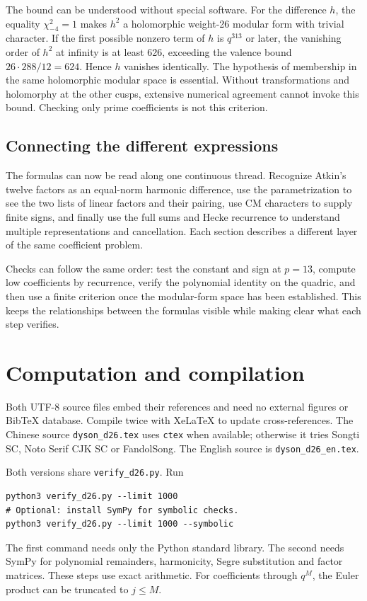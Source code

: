 \documentclass[a4paper,11pt]{article}
\theoremstyle{definition}
\begin{document}
The bound can be understood without special software.
For the difference \(h\), the equality \(\chi_{-4}^2=1\) makes
\(h^2\) a holomorphic weight-26 modular form with trivial character.
If the first possible nonzero term of \(h\) is \(q^{313}\) or later,
the vanishing order of \(h^2\) at infinity is at least 626, exceeding
the valence bound \(26\cdot288/12=624\). Hence \(h\) vanishes identically.
The hypothesis of membership in the same holomorphic modular space
is essential. Without transformations and holomorphy at the other
cusps, extensive numerical agreement cannot invoke this bound.
Checking only prime coefficients is not this criterion.


\subsection{Connecting the different expressions}
The formulas can now be read along one continuous thread.
Recognize Atkin's twelve factors as an equal-norm harmonic difference,
use the parametrization to see the two lists of linear factors and their pairing,
use CM characters to supply finite signs, and finally use the full sums
and Hecke recurrence to understand multiple representations and cancellation.
Each section describes a different layer of the same coefficient problem.

Checks can follow the same order: test the constant and sign at \(p=13\),
compute low coefficients by recurrence, verify the polynomial identity on the quadric,
and then use a finite criterion once the modular-form space has been established.
This keeps the relationships between the formulas visible while making clear
what each step verifies.

\appendix
\section{Computation and compilation}
Both UTF-8 source files embed their references and need no external figures
or BibTeX database. Compile twice with XeLaTeX to update cross-references.
The Chinese source \texttt{dyson\_d26.tex} uses \texttt{ctex} when available;
otherwise it tries Songti SC, Noto Serif CJK SC or FandolSong.
The English source is \texttt{dyson\_d26\_en.tex}.

Both versions share \texttt{verify\_d26.py}. Run
\begin{lstlisting}
python3 verify_d26.py --limit 1000
# Optional: install SymPy for symbolic checks.
python3 verify_d26.py --limit 1000 --symbolic
\end{lstlisting}
The first command needs only the Python standard library.
The second needs SymPy for polynomial remainders, harmonicity,
Segre substitution and factor matrices. These steps use exact arithmetic.
For coefficients through \(q^M\), the Euler product can be truncated to \(j\leq M\).
\end{document}
